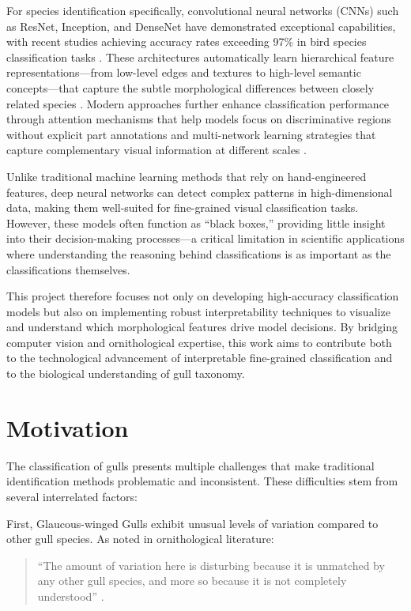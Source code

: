 For species identification specifically, convolutional neural networks (CNNs) such as ResNet, Inception, and DenseNet have demonstrated exceptional capabilities, with recent studies achieving accuracy rates exceeding 97\% in bird species classification tasks \citep{he2016}. These architectures automatically learn hierarchical feature representations—from low-level edges and textures to high-level semantic concepts—that capture the subtle morphological differences between closely related species \citep{simonyan2014}. Modern approaches further enhance classification performance through attention mechanisms that help models focus on discriminative regions without explicit part annotations and multi-network learning strategies that capture complementary visual information at different scales \citep{vaswani2017}.

Unlike traditional machine learning methods that rely on hand-engineered features, deep neural networks can detect complex patterns in high-dimensional data, making them well-suited for fine-grained visual classification tasks. However, these models often function as ``black boxes,'' providing little insight into their decision-making processes—a critical limitation in scientific applications where understanding the reasoning behind classifications is as important as the classifications themselves.

This project therefore focuses not only on developing high-accuracy classification models but also on implementing robust interpretability techniques to visualize and understand which morphological features drive model decisions. By bridging computer vision and ornithological expertise, this work aims to contribute both to the technological advancement of interpretable fine-grained classification and to the biological understanding of gull taxonomy.

\section*{Motivation}

The classification of gulls presents multiple challenges that make traditional identification methods problematic and inconsistent. These difficulties stem from several interrelated factors:

First, Glaucous-winged Gulls exhibit unusual levels of variation compared to other gull species. As noted in ornithological literature:

\begin{quote}
    ``The amount of variation here is disturbing because it is unmatched by any other gull species, and more so because it is not completely understood'' \citep{ornithology2023}.
\end{quote}

